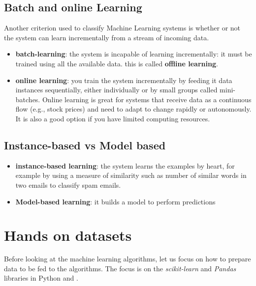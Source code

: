 \documentclass[12pt, letterpaper]{article}
\theoremstyle{definition}
\begin{document}
\subsection{Batch and online Learning}
Another criterion used to classify Machine Learning systems is whether or not the system can learn incrementally from a stream of incoming data.
\begin{itemize}
\item \textbf{batch-learning}: the system is incapable of learning incrementally: it must be trained using all the available data. this is called \textbf{offline learning}.
\item \textbf{online learning}: you train the system incrementally by feeding it data instances sequentially, either individually or by small groups called mini-batches. Online learning is great for systems that receive data as a continuous flow (e.g., stock prices) and need to adapt to change rapidly or autonomously. It is also a good option if you have limited computing resources.
\end{itemize}

\subsection{Instance-based vs Model based}
\begin{itemize}
\item \textbf{instance-based learning}: the system learns the examples by heart, for example by using a measure of similarity such as number of similar words in two emails to classify spam emails.
\item \textbf{Model-based learning}: it builds a model to perform predictions
\end{itemize}

\newpage
\section{Hands on datasets}
Before looking at the machine learning algorithms, let us focus on how to prepare data to be fed to the algorithms. The focus is on the \textit{scikit-learn} and \textit{Pandas} libraries in Python and .
\end{document}
